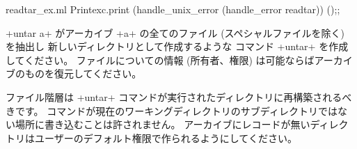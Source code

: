\begin{answer}
\begin{listingcodefile}{readtar_ex.ml}
Printexc.print (handle_unix_error (handle_error readtar)) ();;
\end{listingcodefile}
\end{answer}

\begin{exercise}\label{ex/untar}
\ml+untar a+ がアーカイブ \ml+a+ の全てのファイル (スペシャルファイルを除く) を抽出し
新しいディレクトリとして作成するような
コマンド \ml+untar+ を作成してください。
ファイルについての情報 (所有者、権限) は可能ならばアーカイブのものを復元してください。

ファイル階層は \ml+untar+ コマンドが実行されたディレクトリに再構築されるべきです。
コマンドが現在のワーキングディレクトリのサブディレクトリではない場所に書き込むことは許されません。
アーカイブにレコードが無いディレクトリはユーザーのデフォルト権限で作られるようにしてください。
\end{exercise}

